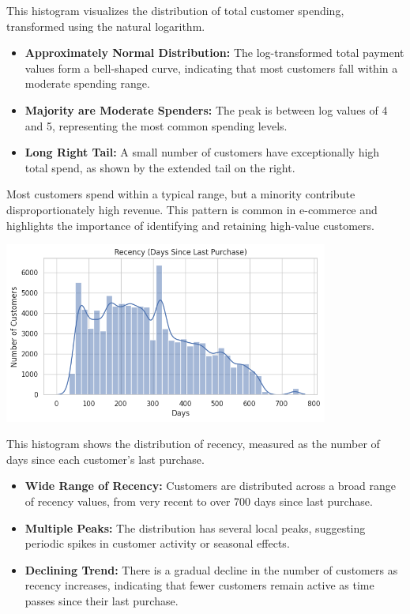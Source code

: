 \documentclass[a4paper]{article}
\begin{document}
\begin{multicols}{2}
This histogram visualizes the distribution of total customer spending, transformed using the natural logarithm.

\begin{itemize}
    \item \textbf{Approximately Normal Distribution:} The log-transformed total payment values form a bell-shaped curve, indicating that most customers fall within a moderate spending range.
    \item \textbf{Majority are Moderate Spenders:} The peak is between log values of 4 and 5, representing the most common spending levels.
    \item \textbf{Long Right Tail:} A small number of customers have exceptionally high total spend, as shown by the extended tail on the right.
\end{itemize}

Most customers spend within a typical range, but a minority contribute disproportionately high revenue. This pattern is common in e-commerce and highlights the importance of identifying and retaining high-value customers.

\vspace{1em}

\noindent
\begin{minipage}{\columnwidth}
\centering
\includegraphics[width=0.8\textwidth]{Recency (Days Since Last Purchase).png}
\label{fig:recency_days}
\end{minipage}

This histogram shows the distribution of recency, measured as the number of days since each customer’s last purchase.

\begin{itemize}
    \item \textbf{Wide Range of Recency:} Customers are distributed across a broad range of recency values, from very recent to over 700 days since last purchase.
    \item \textbf{Multiple Peaks:} The distribution has several local peaks, suggesting periodic spikes in customer activity or seasonal effects.
    \item \textbf{Declining Trend:} There is a gradual decline in the number of customers as recency increases, indicating that fewer customers remain active as time passes since their last purchase.
\end{itemize}


\end{multicols}
\end{document}
